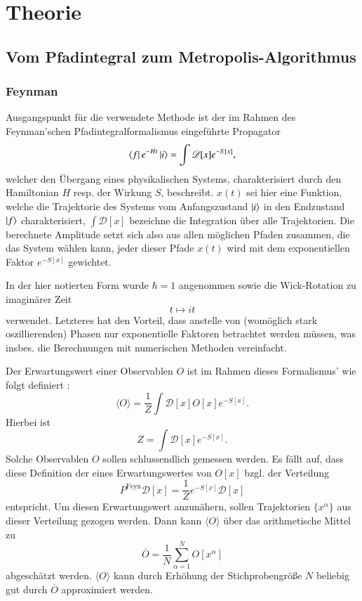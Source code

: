 
\chapter{Theorie}
\label{sec:theorie}


\section{Vom Pfadintegral zum Metropolis-Algorithmus}
\subsection{Feynman}
Ausgangspunkt für die verwendete Methode ist der im Rahmen des Feynman'schen
Pfadintegralformalismus eingeführte Propagator \cite{freedmanCreutz}
\begin{equation} \label{eq:propagator}
    \bra{f} e^{-H t} \ket{i} = \int \mathscr{D}[x] e^{-S[x]},
\end{equation}
welcher den Übergang eines physikalischen Systems, charakterisiert durch den
Hamiltonian $H$ resp. der Wirkung $S$,  beschreibt. $x(t)$ sei hier eine
Funktion, welche die Trajektorie des Systems vom Anfangszustand $\ket{i}$ in
den Endzustand $\ket{f}$ charakterisiert, $\int \mathscr{D}[x]$ bezeichne die
Integration über alle Trajektorien. Die berechnete Amplitude setzt sich also
aus allen möglichen Pfaden zusammen, die das System wählen kann, jeder dieser
Pfade $x(t)$ wird mit dem exponentiellen Faktor $e^{-S[x]}$ gewichtet.

In der hier notierten Form wurde
$\hbar = 1$ angenommen sowie die Wick-Rotation zu imaginärer Zeit
\[
    t \mapsto it
\]
verwendet. Letzteres hat den Vorteil, dass anstelle von (womöglich stark
oszillierenden) Phasen nur exponentielle Faktoren betrachtet werden müssen, was
insbes. die Berechnungen mit numerischen Methoden vereinfacht. \cite{freedmanCreutz}

Der Erwartungswert einer Observablen $O$ ist im Rahmen dieses Formalismus'
wie folgt definiert \cite{freedmanCreutz}:
\[
    \langle O \rangle = \frac{1}{Z} \int \mathscr{D}[x] O[x] e^{-S[x]}.
\]
Hierbei ist
\[
    Z = \int \mathscr{D}[x] e^{-S[x]}.
\]
Solche Observablen $O$ sollen schlussendlich gemessen werden. Es fällt auf, dass
diese Definition der eines Erwartungswertes von $O[x]$ bzgl. der Verteilung
\cite{freedmanCreutz}
\begin{equation} \label{eq:feynmanDensity}
    P^\text{Feyn} \mathscr{D}[x] =  \frac{1}{Z} e^{-S[x]} \mathscr{D}[x]
\end{equation}
entspricht. Um diesen Erwartungswert anzunähern, sollen Trajektorien
$\{x^\alpha\}$ aus dieser Verteilung gezogen werden. Dann kann
$\langle O \rangle$ über das arithmetische Mittel zu
\[
    \overline{O} = \frac{1}{N} \sum_{\alpha=1}^N O[x^\alpha]
\]
abgeschätzt werden. $\langle O \rangle$ kann durch Erhöhung der Stichprobengröße
$N$ beliebig gut durch $\overline{O}$ approximiert werden.

